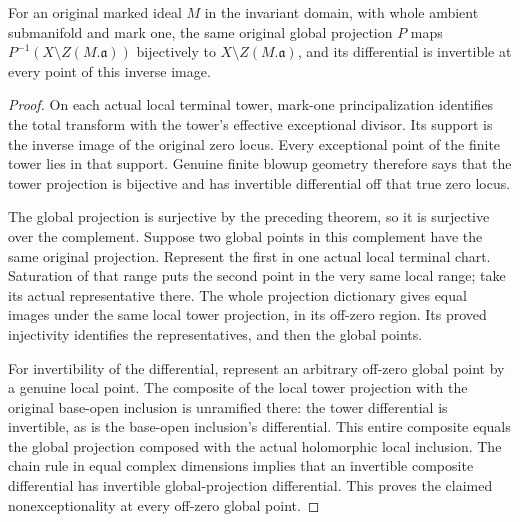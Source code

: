 \begin{theorem}
\label{hir:original-global-terminal-isomorphism-off-true-ideal}
\leanok
{}
For an original marked ideal $M$ in the invariant domain, with whole
ambient submanifold and mark one, the same original global projection
$P$ maps $P^{-1}(X\setminus Z(M.\mathfrak a))$ bijectively to
$X\setminus Z(M.\mathfrak a)$, and its differential is invertible at
every point of this inverse image.
\end{theorem}
\begin{proof}
On each actual local terminal tower, mark-one principalization identifies
the total transform with the tower's effective exceptional divisor.
Its support is the inverse image of the original zero locus.  Every
exceptional point of the finite tower lies in that support.  Genuine
finite blowup geometry therefore says that the tower projection is
bijective and has invertible differential off that true zero locus.

The global projection is surjective by the preceding theorem, so it is
surjective over the complement.  Suppose two global points in this
complement have the same original projection.  Represent the first in
one actual local terminal chart.  Saturation of that range puts the
second point in the very same local range; take its actual representative
there.  The whole projection dictionary gives equal images under the
same local tower projection, in its off-zero region.  Its proved
injectivity identifies the representatives, and then the global points.

For invertibility of the differential, represent an arbitrary off-zero
global point by a genuine local point.  The composite of the local tower
projection with the original base-open inclusion is unramified there:
the tower differential is invertible, as is the base-open inclusion's
differential.  This entire composite equals the global projection
composed with the actual holomorphic local inclusion.  The chain rule in
equal complex dimensions implies that an invertible composite
differential has invertible global-projection differential.  This proves
the claimed nonexceptionality at every off-zero global point.
\end{proof}


